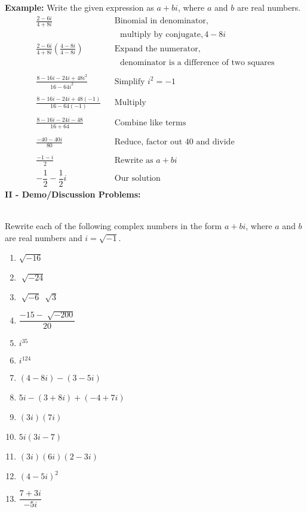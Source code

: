 \documentclass[12pt]{article}
\theoremstyle{definition}
\begin{document}
{\bf Example:} Write the given expression as $a+bi$, where $a$ and $b$ are real numbers.
  \begin{eqnarray*}
    \frac{2 - 6 i}{4 + 8 i} &  & \text{Binomial in denominator},\\
    & & ~~~\text{multiply by conjugate}, 4 - 8 i\\
    \frac{2 - 6 i}{4 + 8 i} \left( \frac{4 - 8 i}{4 - 8 i} \right) &  &
    \text{Expand the numerator},\\
		&&~~~\text{denominator is a difference of two squares}\\
    &  & \\
    \frac{8 - 16 i - 24 i + 48 i^2}{16 - 64 i^2} &  & \text{Simplify \ } i^2 = -
    1\\
    &  & \\
    \frac{8 - 16 i - 24 i + 48 (- 1)}{16 - 64 (- 1)} &  & \text{Multiply}\\
    &  & \\
    \frac{8 - 16 i - 24 i - 48}{16 + 64} &  & \text{Combine like terms}\\
		&  & \\
    \frac{- 40 - 40 i}{80} &  & \text{Reduce, factor out 40 and divide}\\
    &  & \\
    \frac{- 1 - i}{2}& & \text{Rewrite as \ } a+bi\\
		-\dfrac{1}{2} - \dfrac{1}{2}i &  & \text{Our solution}
  \end{eqnarray*}
\newpage
{\bf II - Demo/Discussion Problems:}\\
\ \par
Rewrite each of the following complex numbers in the form $a+bi$, where $a$ and $b$ are real numbers and $i=\sqrt{-1}$.
\begin{multicols}{3}
\begin{enumerate}
	\item $\sqrt{- 16}$
	\item $\sqrt[]{- 24}$
	\item $\sqrt[]{- 6} ~\sqrt[]{3}$
	\item $\dfrac{- 15 - \sqrt[]{- 200}}{20}$
	\item $i^{35}$
	\item $i^{124}$
	\item $(4 - 8 i) - (3 - 5 i)$
	\item $5 i - (3 + 8 i) + (- 4 + 7 i)$
	\item $(3 i) (7 i)$
	\item $5 i (3 i - 7)$
	\item $(3 i) (6 i) (2 - 3 i)$
	\item $(4 - 5 i)^2$
	\item $\dfrac{7 + 3 i}{- 5 i}$
	\end{enumerate}
\end{multicols}
\end{document}

